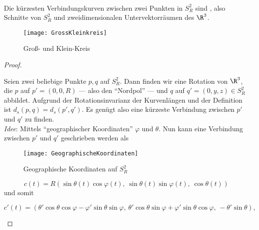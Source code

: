 \begin{lemma}
  \  \\
  \begin{minipage}{.45\textwidth}
    Die kürzesten Verbindungskurven zwischen zwei Punkten in \( S^2_R \) sind , also Schnitte von \( S^2_R \) und zweidimensionalen Untervektorräumen des \( \R^3 \).
  \end{minipage}
  \hfill
  \begin{minipage}{.45\textwidth}
    \begin{figure}[H]
      \texttt{[image: GrossKleinkreis]}
      \caption{Groß- und Klein-Kreis}
    \end{figure}
  \end{minipage}
  \begin{proof}
    \  \\
    \begin{minipage}{.45\textwidth}
      Seien zwei beliebige Punkte \( p,q \) auf \( S^2_R \). Dann finden wir eine Rotation von \( \R^3 \), die \( p \) auf \( p' = (0,0,R) \) --- also den ``Nordpol'' --- und \( q \) auf \( q' = (0,y,z) \in S^2_R \) abbildet. Aufgrund der Rotationsinvarianz der Kurvenlängen und der Definition ist \( d_s(p,q) = d_s(p', q') \). Es genügt also eine kürzeste Verbindung zwischen \( p' \) und \( q' \) zu finden. \\
      \emph{Idee}: Mittels ``geographischer Koordinaten'' \( \varphi \) und \( \theta \). Nun kann eine Verbindung zwischen \( p' \) und \( q' \) geschrieben werden als
    \end{minipage}
    \hfill
    \begin{minipage}{.45\textwidth}
      \begin{figure}[H]
        \texttt{[image: GeographischeKoordinaten]}
        \caption{Geographische Koordinaten auf \( S_R^2 \)}
      \end{figure}
    \end{minipage}
    \begin{equation*}
      c(t) = R(\sin\theta(t)\cos\varphi(t), \ \sin\theta(t)\sin\varphi(t), \ \cos\theta(t))
    \end{equation*}
    und somit
    \begin{small}
      \begin{equation*}
        c'(t) = (\theta'\cos\theta\cos\varphi-\varphi'\sin\theta\sin\varphi, \ \theta'\cos\theta\sin\varphi+\varphi'\sin\theta\cos\varphi, \ -\theta'\sin\theta)\text{,}
      \end{equation*}

\end{small}
\end{proof}
\end{lemma}
